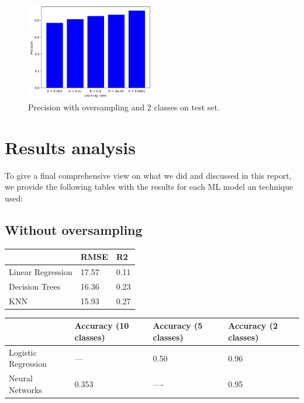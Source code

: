 \documentclass{article}
\begin{document}
\begin{figure}[h!]
    \centering
    \includegraphics[width=0.5\textwidth]{precision_binary_oversampling_nn.png}
    \caption{\label{fig:binary_precision_oversampling}Precision with oversampling and 2 classes on test set.}
\end{figure}
\newpage


\section{Results analysis}
To give a final comprehensive view on what we did and discussed in this report, we provide the following tables with the results for each ML model an technique used:

\subsection{Without oversampling}

\begin{table}[h!]
    \centering
    \begin{tabular}{l|l|l|}
    \cline{2-3}
                                            & RMSE  & R2   \\ \hline
    \multicolumn{1}{|l|}{Linear Regression} & 17.57 & 0.11 \\ \hline
    \multicolumn{1}{|l|}{Decision Trees}    & 16.36 & 0.23 \\ \hline
    \multicolumn{1}{|l|}{KNN}               & 15.93 & 0.27 \\ \hline
\end{tabular}
\end{table}

\begin{table}[h!]
    \centering
    \begin{tabular}{l|l|l|l|}
    \cline{2-4}
                                              & Accuracy (10 classes) & Accuracy (5 classes)  & Accuracy (2 classes) \\ \hline
    \multicolumn{1}{|l|}{Logistic Regression} & ---                   & 0.50                  & 0.96                 \\ \hline
    \multicolumn{1}{|l|}{Neural Networks}     & 0.353                 & ----                  & 0.95                 \\ \hline
\end{tabular}
\end{table}
\end{document}
